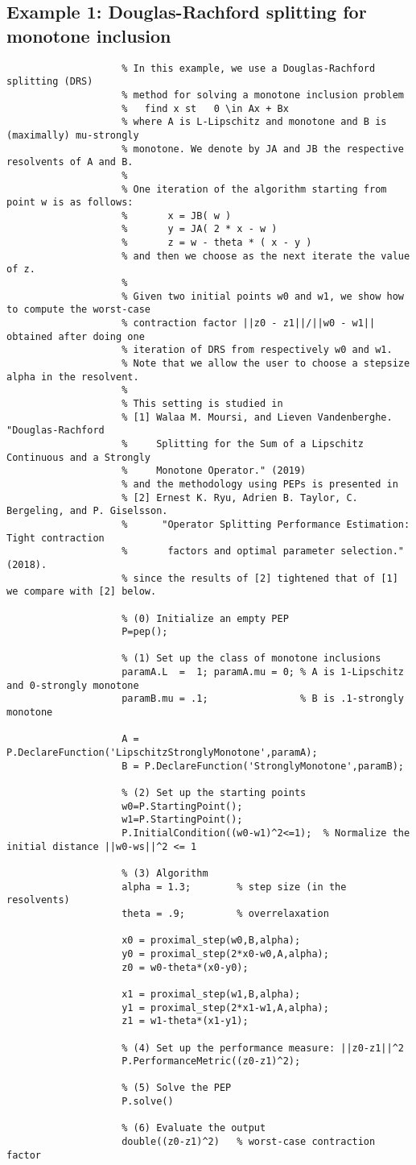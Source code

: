 \documentclass[11pt,a4paper]{article}
\begin{document}
					\subsection{Example 1: Douglas-Rachford splitting for monotone inclusion}
					\begin{lstlisting}
					% In this example, we use a Douglas-Rachford splitting (DRS) 
					% method for solving a monotone inclusion problem
					%   find x st   0 \in Ax + Bx 
					% where A is L-Lipschitz and monotone and B is (maximally) mu-strongly
					% monotone. We denote by JA and JB the respective resolvents of A and B.
					%
					% One iteration of the algorithm starting from point w is as follows:
					%       x = JB( w )
					%       y = JA( 2 * x - w )
					%       z = w - theta * ( x - y )
					% and then we choose as the next iterate the value of z.
					%
					% Given two initial points w0 and w1, we show how to compute the worst-case
					% contraction factor ||z0 - z1||/||w0 - w1|| obtained after doing one
					% iteration of DRS from respectively w0 and w1.
					% Note that we allow the user to choose a stepsize alpha in the resolvent.
					%
					% This setting is studied in
					% [1] Walaa M. Moursi, and Lieven Vandenberghe. "Douglas-Rachford
					%     Splitting for the Sum of a Lipschitz Continuous and a Strongly
					%     Monotone Operator." (2019)
					% and the methodology using PEPs is presented in
					% [2] Ernest K. Ryu, Adrien B. Taylor, C. Bergeling, and P. Giselsson.
					%      "Operator Splitting Performance Estimation: Tight contraction
					%       factors and optimal parameter selection." (2018).
					% since the results of [2] tightened that of [1] we compare with [2] below.
					
					% (0) Initialize an empty PEP
					P=pep();
					
					% (1) Set up the class of monotone inclusions
					paramA.L  =  1; paramA.mu = 0; % A is 1-Lipschitz and 0-strongly monotone
					paramB.mu = .1;                % B is .1-strongly monotone
					
					A = P.DeclareFunction('LipschitzStronglyMonotone',paramA);
					B = P.DeclareFunction('StronglyMonotone',paramB);
					
					% (2) Set up the starting points
					w0=P.StartingPoint();
					w1=P.StartingPoint();
					P.InitialCondition((w0-w1)^2<=1);  % Normalize the initial distance ||w0-ws||^2 <= 1
					
					% (3) Algorithm
					alpha = 1.3;		% step size (in the resolvents)
					theta = .9;         % overrelaxation
					
					x0 = proximal_step(w0,B,alpha);
					y0 = proximal_step(2*x0-w0,A,alpha);
					z0 = w0-theta*(x0-y0);
					
					x1 = proximal_step(w1,B,alpha);
					y1 = proximal_step(2*x1-w1,A,alpha);
					z1 = w1-theta*(x1-y1);
					
					% (4) Set up the performance measure: ||z0-z1||^2
					P.PerformanceMetric((z0-z1)^2);
					
					% (5) Solve the PEP
					P.solve()
					
					% (6) Evaluate the output
					double((z0-z1)^2)   % worst-case contraction factor
					\end{lstlisting}
					\clearpage
\end{document}
